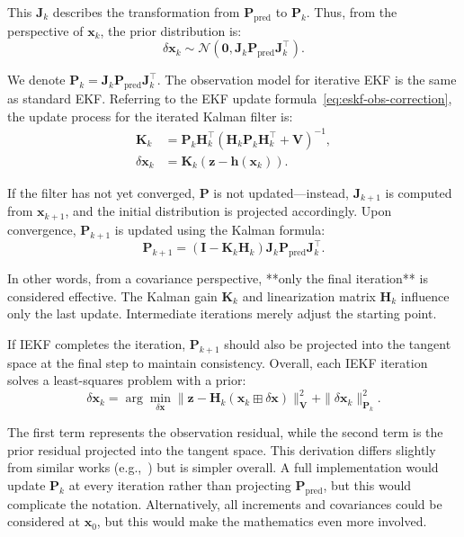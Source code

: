This \(\bm{J}_k\) describes the transformation from \(\bm{P}_{\mathrm{pred}}\) to \(\bm{P}_k\). Thus, from the perspective of \(\bm{x}_{k}\), the prior distribution is:  
\begin{equation}\label{key}  
	\delta \bm{x}_k \sim \mathcal{N}(\bm{0}, \bm{J}_k \bm{P}_{\mathrm{pred}} \bm{J}_k^\top).  
\end{equation}  

We denote \(\bm{P}_k = \bm{J}_k \bm{P}_{\mathrm{pred}} \bm{J}_k^\top\). The observation model for iterative EKF is the same as standard EKF. Referring to the EKF update formula~\eqref{eq:eskf-obs-correction}, the update process for the iterated Kalman filter is:  
\begin{subequations}\label{eq:ieskf-obs-correction}  
	\begin{align}  
		\bm{K}_k &= \bm{P}_{k} \bm{H}_k^\top(\bm{H}_k \bm{P}_{k}   
		\bm{H}_k^\top + \bm{V})^{-1} ,\\  
		\delta \bm{x}_k &= \bm{K}_k (\bm{z} - \bm{h}(\bm{x}_k)).  
	\end{align}  
\end{subequations}  

If the filter has not yet converged, \(\bm{P}\) is not updated—instead, \(\bm{J}_{k+1}\) is computed from \(\bm{x}_{k+1}\), and the initial distribution is projected accordingly. Upon convergence, \(\bm{P}_{k+1}\) is updated using the Kalman formula:  
\begin{equation}\label{eq:update-of-iekf}  
	\bm{P}_{k+1} = (\bm{I} - \bm{K}_k \bm{H}_k)\bm{J}_k \bm{P}_{\mathrm{pred}} \bm{J}_k^\top.  
\end{equation}  

In other words, from a covariance perspective, **only the final iteration** is considered effective. The Kalman gain \(\bm{K}_k\) and linearization matrix \(\bm{H}_k\) influence only the last update. Intermediate iterations merely adjust the starting point.  

If IEKF completes the iteration, \(\bm{P}_{k+1}\) should also be projected into the tangent space at the final step to maintain consistency. Overall, each IEKF iteration solves a least-squares problem with a prior:  
\begin{equation}\label{key}  
	\delta \bm{x}_k = \arg \min\limits_{\delta \bm{x}} \| \bm{z} - \bm{H}_k(\bm{x}_k \boxplus \delta \bm{x}) \|_{\bm{V}}^2 + \| \delta \bm{x}_k \|_{\bm{P}_k}^2.  
\end{equation}  

The first term represents the observation residual, while the second term is the prior residual projected into the tangent space. This derivation differs slightly from similar works (e.g.,~\cite{he2021kalman,Barfoot2016}) but is simpler overall. A full implementation would update \(\bm{P}_k\) at every iteration rather than projecting \(\bm{P}_{\mathrm{pred}}\), but this would complicate the notation. Alternatively, all increments and covariances could be considered at \(\bm{x}_0\), but this would make the mathematics even more involved.

